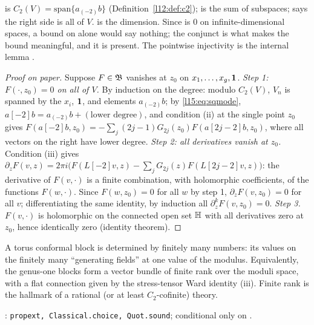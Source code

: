\begin{dictionary}
 is $C_2(V)=\mathrm{span}\{a_{(-2)}b\}$ (Definition~\ref{l12:def:c2});  is the sum of subspaces;
 says the right side is all of $V$.  is the dimension. Since
 is $0$ on infinite-dimensional spaces, a bound on  alone would say nothing; the conjunct
 is what makes the bound meaningful, and it is present. The pointwise injectivity is the
internal lemma \allowbreak{}\allowbreak{}.
\end{dictionary}

\begin{proof}[Proof on paper]
Suppose $F\in\mathfrak{B}$ vanishes at $z_0$ on $x_1,\dots,x_g,\mathbf{1}$. \emph{Step 1: $F(\cdot,z_0)=0$ on all of $V$.}
By induction on the degree: modulo $C_2(V)$, $V_n$ is spanned by the $x_i$, $\mathbf{1}$, and elements $a_{(-2)}b$; by
\eqref{l15:eq:sqmode}, $a[-2]b=a_{(-2)}b+(\text{lower degree})$, and condition (ii) at the single point $z_0$ gives
$F(a[-2]b,z_0)=-\sum_j(2j-1)G_{2j}(z_0)F(a[2j-2]b,z_0)$, where all vectors on the right have lower degree. \emph{Step 2: all
derivatives vanish at $z_0$.} Condition (iii) gives $\partial_zF(v,z)=2\pi i\bigl(F(L[-2]v,z)-\sum_jG_{2j}(z)F(L[2j-2]v,z)\bigr)$:
the derivative of $F(v,\cdot)$ is a finite combination, with holomorphic coefficients, of the functions $F(w,\cdot)$. Since
$F(w,z_0)=0$ for all $w$ by step 1, $\partial_zF(v,z_0)=0$ for all $v$; differentiating the same identity, by induction all
$\partial_z^kF(v,z_0)=0$. \emph{Step 3.} $F(v,\cdot)$ is holomorphic on the connected open set $\mathbb{H}$ with all
derivatives zero at $z_0$, hence identically zero (identity theorem).
\end{proof}

\begin{physics}
A torus conformal block is determined by finitely many numbers: its values on the finitely many ``generating fields''
at one value of the modulus. Equivalently, the genus-one blocks form a vector bundle of finite rank over the moduli space,
with a flat connection given by the stress-tensor Ward identity (iii). Finite rank is the hallmark of a rational (or at
least $C_2$-cofinite) theory.
\end{physics}

\begin{status}
\allowbreak{}\allowbreak{}: \texttt{propext, Classical.choice, Quot.sound}; conditional only on
.
\end{status}


